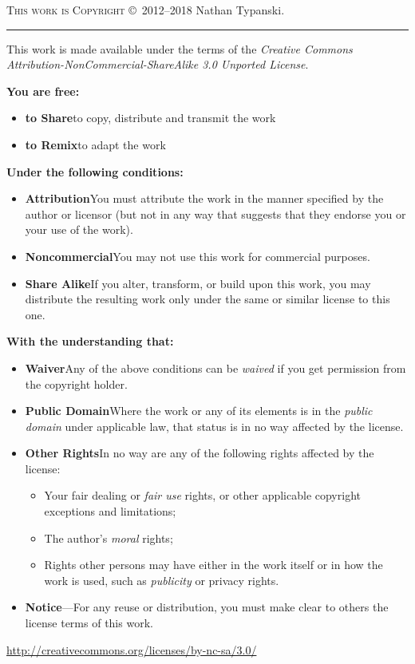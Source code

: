 \begin{center}
\textsc{This work is Copyright} \copyright\ 2012--2018 Nathan Typanski.
\\\noindent\rule{\textwidth}{0.4pt}
\end{center}

This work is made available under the terms of the \emph{Creative Commons
    Attribution-NonCommercial-ShareAlike 3.0 Unported License}.

\textbf{You are free:}
\begin{itemize}
  \item[] \textbf{to Share}\dash{}to copy, distribute and transmit the work
  \item[] \textbf{to Remix}\dash{}to adapt the work
\end{itemize}

\textbf{Under the following conditions:}
\begin{itemize}
  \item[]\ccby\textbf{Attribution}\dash{}You must attribute the work in the manner
      specified by the author or licensor (but not in any way that suggests that
      they endorse you or your use of the work).
  \item[] \ccnc\textbf{Noncommercial}\dash{}You may not use this work for
      commercial purposes.
  \item[] \ccsa\textbf{Share Alike}\dash{}If you alter, transform, or build upon
      this work, you may distribute the resulting work only under the same or
      similar license to this one.
\end{itemize}

\textbf{With the understanding that:}
\begin{itemize}
  \item[]\textbf{Waiver}\dash{}Any of the above conditions can be \emph{waived} if
      you get permission from the copyright holder.
  \item[]\textbf{Public Domain}\dash{}Where the work or any of its elements is in
      the \emph{public domain} under applicable law, that status is in no way
      affected by the license.
  \item[]\textbf{Other Rights}\dash{}In no way are any of the following rights
      affected by the license:
  \begin{itemize}
    \item Your fair dealing or \emph{fair use} rights, or other applicable
        copyright exceptions and limitations;
    \item The author's \emph{moral} rights;
    \item Rights other persons may have either in the work itself or in how the
        work is used, such as \emph{publicity} or privacy rights.
  \end{itemize}
  \item[]\textbf{Notice}---For any reuse or distribution, you must make clear
      to others the license terms of this work.
\end{itemize}
\begin{center}
  \url{http://creativecommons.org/licenses/by-nc-sa/3.0/}

  \cc{}
\end{center}
